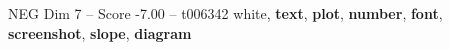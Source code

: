 \begin{textsample}{NEG Dim 7 – Score -7.00 – t006342}  \label{ex:f7_neg_026}
white, \textbf{text}, \textbf{plot}, \textbf{number}, \textbf{font}, \textbf{screenshot}, \textbf{slope}, \textbf{diagram}

\end{textsample}
